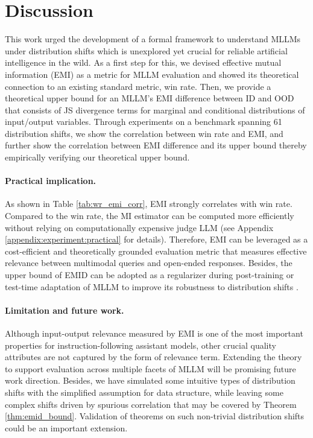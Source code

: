 \section{Discussion} \label{sec:conclusion}
This work urged the development of a formal framework to understand MLLMs under distribution shifts which is unexplored yet crucial for reliable artificial intelligence in the wild. As a first step for this, we devised effective mutual information (EMI) as a metric for MLLM evaluation and showed its theoretical connection to an existing standard metric, win rate. Then, we provide a theoretical upper bound for an MLLM's EMI difference between ID and OOD that consists of JS divergence terms for marginal and conditional distributions of input/output variables. Through experiments on a benchmark spanning 61 distribution shifts, we show the correlation between win rate and EMI, and further show the correlation between EMI difference and its upper bound thereby empirically verifying our theoretical upper bound.

\vspace{-0.2cm}
\paragraph{Practical implication.} 
As shown in Table \ref{tab:wr_emi_corr}, EMI strongly correlates with win rate. Compared to the win rate, the MI estimator can be computed more efficiently without relying on computationally expensive judge LLM \cite{achiam2023gpt} (see Appendix \ref{appendix:experiment:practical} for details). Therefore, EMI can be leveraged as a cost-efficient and theoretically grounded evaluation metric that measures effective relevance between multimodal queries and open-ended responses. Besides, the upper bound of EMID can be adopted as a regularizer during post-training or test-time adaptation of MLLM to improve its robustness to distribution shifts \cite{li2023robust}.

\vspace{-0.2cm}
\paragraph{Limitation and future work.} 
Although input-output relevance measured by EMI is one of the most important properties for instruction-following assistant models, other crucial quality attributes are not captured by the form of relevance term. Extending the theory to support evaluation across multiple facets of MLLM will be promising future work direction. Besides, we have simulated some intuitive types of distribution shifts with the simplified assumption for data structure, while leaving some complex shifts driven by spurious correlation \cite{simon1954spurious} that may be covered by Theorem \ref{thm:emid_bound}. Validation of theorems on such non-trivial distribution shifts could be an important extension.